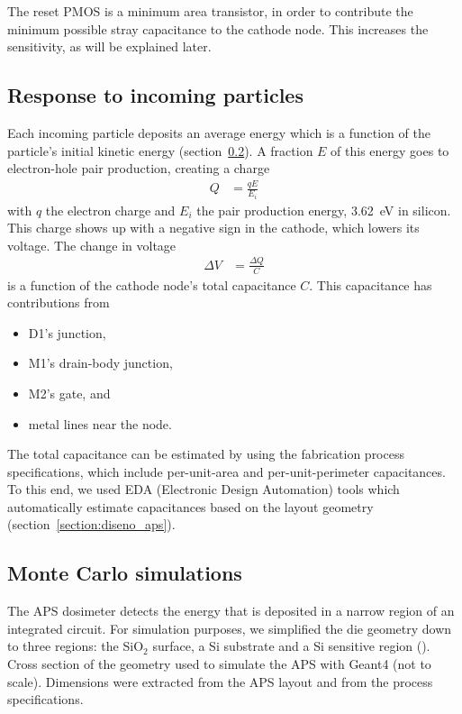 The reset PMOS is a minimum area transistor,
in order to contribute the minimum possible stray capacitance
to the cathode node.
This increases the sensitivity, as will be explained later.
\subsection{Response to incoming particles}
Each incoming particle deposits an average energy which is a function of
the particle's initial kinetic energy
\cite{berger_response_1969} (section~\ref{montecarloaps}).
A fraction $E$ of this energy goes to electron-hole pair production,
creating a charge
\begin{align*}
    Q &= \frac{qE}{E_i}
\end{align*}
with $q$ the electron charge and $E_i$ the pair production energy,
\SI{3.62}{\electronvolt} in silicon.
This charge shows up with a negative sign in the cathode, which lowers its voltage.
The change in voltage
\begin{align*}
    \Delta V &= \frac{\Delta Q}{C}
\end{align*}
is a function of the cathode node's total capacitance $C$.
This capacitance has contributions from
\begin{itemize}
    \item D1's junction,
    \item M1's drain-body junction,
    \item M2's gate, and
    \item metal lines near the node.
\end{itemize}
The total capacitance can be estimated by using the 
fabrication process specifications,
which include per-unit-area and per-unit-perimeter capacitances.
To this end, we used EDA (Electronic Design Automation) tools
which automatically estimate capacitances
based on the layout geometry
(section~\ref{section:diseno_aps}).
\subsection{Monte Carlo simulations}
\label{montecarloaps}
The APS dosimeter detects the energy that is deposited
in a narrow region of an integrated circuit.
For simulation purposes,
we simplified the die geometry down to three regions:
the SiO$_2$ surface, a Si substrate and
a Si sensitive region ().
{Cross section of the geometry used to simulate the APS with Geant4 (not to scale).}
Dimensions were extracted from the APS layout and
from the process specifications.

